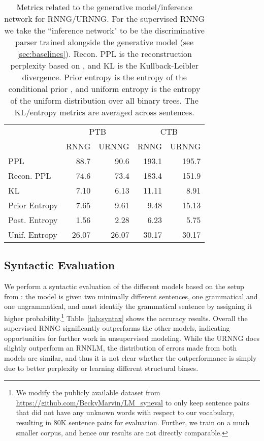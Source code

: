 \documentclass[11pt,a4paper]{article}
\begin{document}
\begin{table}[t]
    \small
    \centering
    \begin{tabular}{l r r r r }
    \toprule
    & \multicolumn{2}{c}{PTB} & \multicolumn{2}{c}{CTB} \\
    & RNNG & URNNG & RNNG & URNNG \\
    \midrule
    PPL & 88.7 & 90.6 & 193.1 & 195.7 \\
    Recon. PPL & 74.6 & 73.4 & 183.4 & 151.9 \\
    KL & 7.10 & 6.13  & 11.11 & 8.91 \\
    Prior Entropy & 7.65 & 9.61 & 9.48 & 15.13 \\
    Post. Entropy & 1.56 & 2.28 & 6.23 & 5.75  \\
    Unif. Entropy & 26.07  & 26.07  &  30.17 & 30.17 \\
\bottomrule
    \end{tabular}
        \vspace{-2mm}
    \caption{Metrics related to the generative model/inference network for RNNG/URNNG. For the supervised RNNG we take the ``inference network" to be the discriminative parser trained alongside the generative model (see \cref{sec:baselines}).  Recon. PPL is the reconstruction perplexity based on  , and KL is the Kullback-Leibler divergence. Prior entropy is the entropy of the conditional prior , and uniform entropy is the entropy of the uniform distribution over all binary trees. The KL/entropy metrics are averaged across sentences.}
    \label{tab:entropy}
      \vspace{-1mm}
\end{table}
\vspace{-1.5mm}
\subsection{Syntactic Evaluation}
\vspace{-1.5mm}
We perform a syntactic evaluation of the different models based on the setup from
\citet{marvin2018syntax}: the model is given two minimally different sentences, one grammatical and one ungrammatical, and must identify the grammatical sentence by assigning it higher probability.\footnote{We modify the publicly available dataset from \url{https://github.com/BeckyMarvin/LM_syneval} to only keep sentence pairs that did not have any unknown words with respect to our vocabulary, resulting in 80K sentence pairs for evaluation. Further, we train on a much smaller corpus, and hence our results are not directly comparable.} Table~\ref{tab:syntax}
shows the accuracy results.  Overall the supervised RNNG significantly outperforms the other models, indicating opportunities for further work in unsupervised modeling. While the URNNG does slightly outperform an RNNLM, the distribution of errors made from both models are similar, and thus it is not clear whether the outperformance is simply due to better perplexity or learning different structural biases.
\vspace{-1.5mm}
\end{document}
